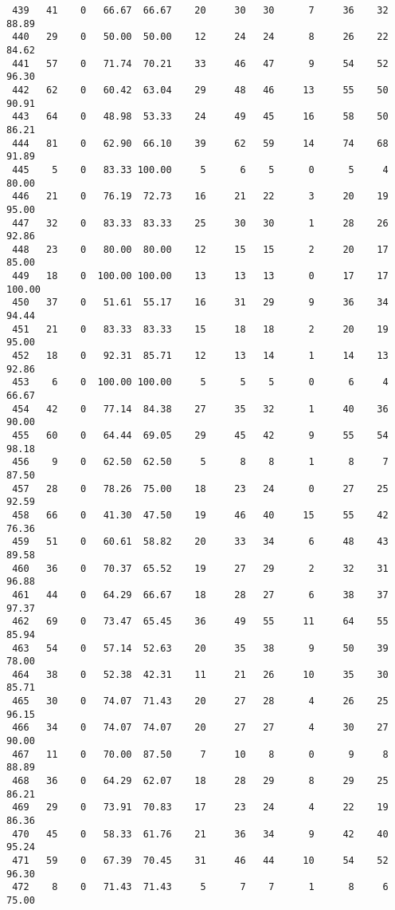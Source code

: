 \begin{verbatim}
 439   41    0   66.67  66.67    20     30   30      7     36    32    88.89
 440   29    0   50.00  50.00    12     24   24      8     26    22    84.62
 441   57    0   71.74  70.21    33     46   47      9     54    52    96.30
 442   62    0   60.42  63.04    29     48   46     13     55    50    90.91
 443   64    0   48.98  53.33    24     49   45     16     58    50    86.21
 444   81    0   62.90  66.10    39     62   59     14     74    68    91.89
 445    5    0   83.33 100.00     5      6    5      0      5     4    80.00
 446   21    0   76.19  72.73    16     21   22      3     20    19    95.00
 447   32    0   83.33  83.33    25     30   30      1     28    26    92.86
 448   23    0   80.00  80.00    12     15   15      2     20    17    85.00
 449   18    0  100.00 100.00    13     13   13      0     17    17   100.00
 450   37    0   51.61  55.17    16     31   29      9     36    34    94.44
 451   21    0   83.33  83.33    15     18   18      2     20    19    95.00
 452   18    0   92.31  85.71    12     13   14      1     14    13    92.86
 453    6    0  100.00 100.00     5      5    5      0      6     4    66.67
 454   42    0   77.14  84.38    27     35   32      1     40    36    90.00
 455   60    0   64.44  69.05    29     45   42      9     55    54    98.18
 456    9    0   62.50  62.50     5      8    8      1      8     7    87.50
 457   28    0   78.26  75.00    18     23   24      0     27    25    92.59
 458   66    0   41.30  47.50    19     46   40     15     55    42    76.36
 459   51    0   60.61  58.82    20     33   34      6     48    43    89.58
 460   36    0   70.37  65.52    19     27   29      2     32    31    96.88
 461   44    0   64.29  66.67    18     28   27      6     38    37    97.37
 462   69    0   73.47  65.45    36     49   55     11     64    55    85.94
 463   54    0   57.14  52.63    20     35   38      9     50    39    78.00
 464   38    0   52.38  42.31    11     21   26     10     35    30    85.71
 465   30    0   74.07  71.43    20     27   28      4     26    25    96.15
 466   34    0   74.07  74.07    20     27   27      4     30    27    90.00
 467   11    0   70.00  87.50     7     10    8      0      9     8    88.89
 468   36    0   64.29  62.07    18     28   29      8     29    25    86.21
 469   29    0   73.91  70.83    17     23   24      4     22    19    86.36
 470   45    0   58.33  61.76    21     36   34      9     42    40    95.24
 471   59    0   67.39  70.45    31     46   44     10     54    52    96.30
 472    8    0   71.43  71.43     5      7    7      1      8     6    75.00

\end{verbatim}
